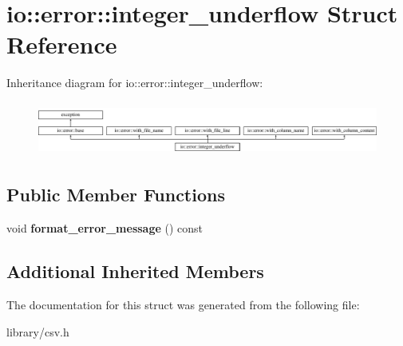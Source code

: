 \hypertarget{structio_1_1error_1_1integer__underflow}{}\section{io\+:\+:error\+:\+:integer\+\_\+underflow Struct Reference}
\label{structio_1_1error_1_1integer__underflow}
Inheritance diagram for io\+:\+:error\+:\+:integer\+\_\+underflow\+:\begin{figure}[H]
\begin{center}
\leavevmode
\includegraphics[height=1.787234cm]{structio_1_1error_1_1integer__underflow}
\end{center}
\end{figure}
\subsection*{Public Member Functions}
\begin{DoxyCompactItemize}
\item 
\mbox{\label{structio_1_1error_1_1integer__underflow_a2ded9c7e982403877055514543207847}} 
void {\bfseries format\+\_\+error\+\_\+message} () const
\end{DoxyCompactItemize}
\subsection*{Additional Inherited Members}


The documentation for this struct was generated from the following file\+:\begin{DoxyCompactItemize}
\item 
library/csv.\+h\end{DoxyCompactItemize}
